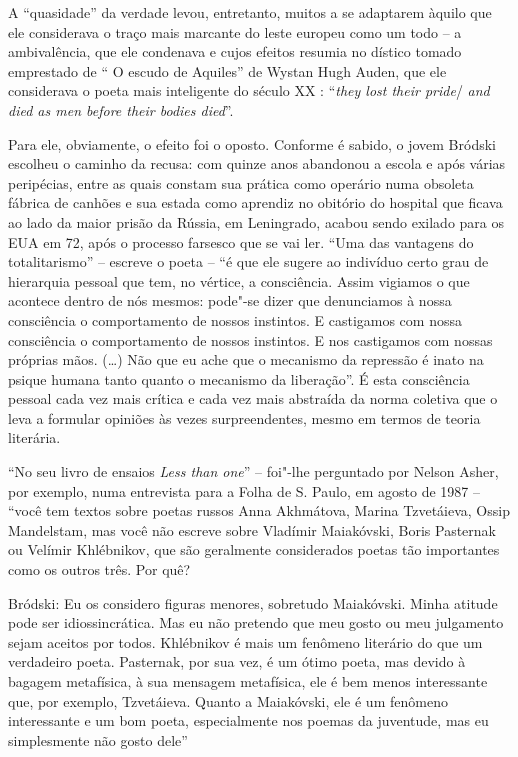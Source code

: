 A ``quasidade'' da verdade levou, entretanto, muitos a se adaptarem
àquilo que ele considerava o traço mais marcante do leste europeu como
um todo -- a ambivalência, que ele condenava e cujos efeitos resumia no
dístico tomado emprestado de `` O escudo de Aquiles'' de Wystan Hugh
Auden, que ele considerava o poeta mais inteligente do século XX :
``\emph{they lost their pride}/ \emph{and died as men before their
bodies died}''.

Para ele, obviamente, o efeito foi o oposto. Conforme é sabido, o jovem
Bródski escolheu o caminho da recusa: com quinze anos abandonou a escola
e após várias peripécias, entre as quais constam sua prática como
operário numa obsoleta fábrica de canhões e sua estada como aprendiz no
obitório do hospital que ficava ao lado da maior prisão da Rússia, em
Leningrado, acabou sendo exilado para os EUA em 72, após o processo
farsesco que se vai ler. ``Uma das vantagens do totalitarismo'' --
escreve o poeta -- ``é que ele sugere ao indivíduo certo grau de
hierarquia pessoal que tem, no vértice, a consciência. Assim vigiamos o
que acontece dentro de nós mesmos: pode"-se dizer que denunciamos à nossa
consciência o comportamento de nossos instintos. E castigamos com nossa
consciência o comportamento de nossos instintos. E nos castigamos com
nossas próprias mãos. (\ldots{}) Não que eu ache que o mecanismo da repressão
é inato na psique humana tanto quanto o mecanismo da liberação''. É esta
consciência pessoal cada vez mais crítica e cada vez mais abstraída da
norma coletiva que o leva a formular opiniões às vezes surpreendentes,
mesmo em termos de teoria literária.

``No seu livro de ensaios \emph{Less than one}'' -- foi"-lhe perguntado
por Nelson Asher, por exemplo, numa entrevista para a Folha de S. Paulo,
em agosto de 1987 -- ``você tem textos sobre poetas russos Anna
Akhmátova, Marina Tzvetáieva, Ossip Mandelstam, mas você não escreve
sobre Vladímir Maiakóvski, Boris Pasternak ou Velímir Khlébnikov, que
são geralmente considerados poetas tão importantes como os outros três.
Por quê?

Bródski: Eu os considero figuras menores, sobretudo Maiakóvski. Minha
atitude pode ser idiossincrática. Mas eu não pretendo que meu gosto ou
meu julgamento sejam aceitos por todos. Khlébnikov é mais um fenômeno
literário do que um verdadeiro poeta. Pasternak, por sua vez, é um ótimo
poeta, mas devido à bagagem metafísica, à sua mensagem metafísica, ele é
bem menos interessante que, por exemplo, Tzvetáieva. Quanto a
Maiakóvski, ele é um fenômeno interessante e um bom poeta, especialmente
nos poemas da juventude, mas eu simplesmente não gosto dele''

